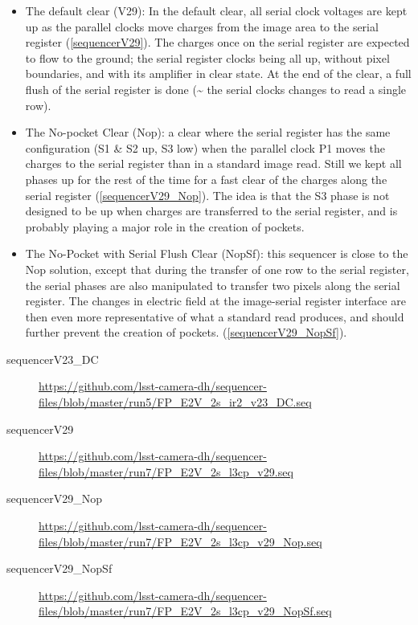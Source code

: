 \begin{itemize}
\tightlist
\item
  The default clear (V29): In the default clear, all serial clock voltages are
  kept up as the parallel clocks move charges from the image area to the
  serial register (\hyperref[sequencerV29]{{[}sequencerV29{]}}). The
  charges once on the serial register are expected to flow to the ground;
  the serial register clocks being all up, without pixel boundaries, and
  with its amplifier in clear state. At the end of the clear, a full
  flush of the serial register is done (\textasciitilde{} the serial
  clocks changes to read a single row).
\item
  The No-pocket Clear (Nop): a clear where the serial register has the
  same configuration (S1 \& S2 up, S3 low) when the parallel clock P1
  moves the charges to the serial register than in a standard image read. Still we kept all phases up for the rest of the time for a fast clear
  of the charges along the serial register
  (\hyperref[sequencerV29_Nop]{{[}sequencerV29\_Nop{]}}). The idea is
  that the S3 phase is not designed to be up when charges are transferred
  to the serial register, and is probably playing a major role in the creation of pockets.
\item
  The No-Pocket with Serial Flush Clear (NopSf): this sequencer is close
  to the Nop solution, except that during the transfer of one row to
  the serial register, the serial phases are also manipulated to transfer two
  pixels along the serial register. The changes in electric field at the
  image-serial register interface are then even more representative of
  what a standard read produces, and should further prevent the
  creation of pockets.
  (\hyperref[sequencerV29_NopSf]{{[}sequencerV29\_NopSf{]}}).
\end{itemize}
\begin{description}
\item[\label{sequencerV23_DC}{sequencerV23\_DC}]
\url{https://github.com/lsst-camera-dh/sequencer-files/blob/master/run5/FP_E2V_2s_ir2_v23_DC.seq}
\item[\label{sequencerV29}{sequencerV29}]
\url{https://github.com/lsst-camera-dh/sequencer-files/blob/master/run7/FP_E2V_2s_l3cp_v29.seq}
\item[\label{sequencerV29_Nop}{sequencerV29\_Nop}]
\url{https://github.com/lsst-camera-dh/sequencer-files/blob/master/run7/FP_E2V_2s_l3cp_v29_Nop.seq}
\item[\label{sequencerV29_NopSf}{sequencerV29\_NopSf}]
\url{https://github.com/lsst-camera-dh/sequencer-files/blob/master/run7/FP_E2V_2s_l3cp_v29_NopSf.seq}
\end{description}

